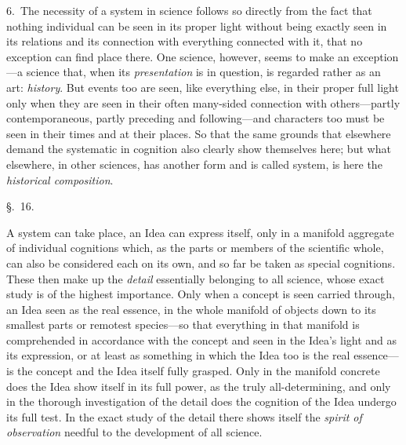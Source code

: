 \documentclass[12pt,a4paper]{book}
\begin{document}
6.~The necessity of a system in science follows so directly from the fact that nothing
individual can be seen in its proper light without being exactly seen in its relations and
its connection with everything connected with it, that no exception can find place there.
One science, however, seems to make an exception---a science that, when its
\emph{presentation} is in question, is regarded rather as an art: \emph{history}. But
events too are seen, like everything else, in their proper full light only when they are
seen in their often many-sided connection with others---partly contemporaneous, partly
preceding and following---and characters too must be seen in their times and at their
places. So that the same grounds that elsewhere demand the systematic in cognition also
clearly show themselves here; but what elsewhere, in other sciences, has another form and
is called system, is here the \emph{historical composition}.

\begin{center}\large\S.~16.\end{center}
A system can take place, an Idea can express itself, only in a manifold aggregate of
individual cognitions which, as the parts or members of the scientific whole, can also be
considered each on its own, and so far be taken as special cognitions. These then make up
the \emph{detail} essentially belonging to all science, whose exact study is of the
highest importance. Only when a concept is seen carried through, an Idea seen as the real
essence, in the whole manifold of objects down to its smallest parts or remotest
species---so that everything in that manifold is comprehended in accordance with the
concept and seen in the Idea's light and as its expression, or at least as something in
which the Idea too is the real essence---is the concept and the Idea itself fully grasped.
Only in the manifold concrete does the Idea show itself in its full power, as the truly
all-determining, and only in the thorough investigation of the detail does the cognition
of the Idea undergo its full test. In the exact study of the detail there shows itself the
\emph{spirit of observation} needful to the development of all science.
\end{document}
